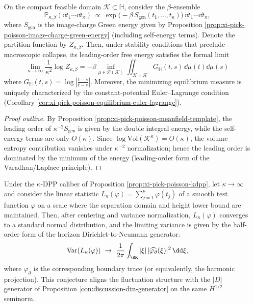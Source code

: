 \begin{proposition}\label{prop:xi-beta-ensemble-leading-free-energy}
On the compact feasible domain \(\mathcal K\subset\mathbb H\), consider the \(\beta\)-ensemble
\[
\mathbb P_{\kappa,\beta}(\dd t_1\cdots \dd t_\kappa)
\ \propto\
\exp\!\bigl(-\beta\,S_{\mathrm{gen}}(t_1,\dots,t_\kappa)\bigr)\,\dd t_1\cdots \dd t_\kappa,
\]
where \(S_{\mathrm{gen}}\) is the image-charge Green energy given by Proposition \ref{prop:xi-pick-poisson-image-charge-green-energy} (including self-energy terms).
Denote the partition function by \(Z_{\kappa,\beta}\).
Then, under stability conditions that preclude macroscopic collapse, its leading-order free energy satisfies the formal limit
\[
\boxed{\;
\lim_{\kappa\to\infty}\frac{1}{\kappa^2}\log Z_{\kappa,\beta}
=-\beta\inf_{\mu\in\mathcal P(\mathcal K)}
\iint_{\mathcal K\times\mathcal K}G_{\mathbb H}(t,s)\,\dd\mu(t)\dd\mu(s)\;}
\]
where \(G_{\mathbb H}(t,s)=\log\left|\frac{t-\overline s}{t-s}\right|\).
Moreover, the minimizing equilibrium measure is uniquely characterized by the constant-potential Euler--Lagrange condition (Corollary \ref{cor:xi-pick-poisson-equilibrium-euler-lagrange}).
\end{proposition}
\begin{proof}[Proof outline]
By Proposition \ref{prop:xi-pick-poisson-meanfield-template}, the leading order of \(\kappa^{-2}S_{\mathrm{gen}}\) is given by the double integral energy, while the self-energy terms are only \(O(\kappa)\).
Since \(\log\mathrm{Vol}(\mathcal K^\kappa)=O(\kappa)\), the volume entropy contribution vanishes under \(\kappa^{-2}\) normalization;
hence the leading order is dominated by the minimum of the energy (leading-order form of the Varadhan/Laplace principle). \qedhere
\end{proof}

\begin{conjecture}\label{conj:xi-kdpp-linear-statistics-clt}
Under the \(\kappa\)-DPP caliber of Proposition \ref{prop:xi-pick-poisson-kdpp}, let \(\kappa\to\infty\) and consider the linear statistic
\(
L_\kappa(\varphi)=\sum_{j=1}^{\kappa}\varphi(t_j)
\)
of a smooth test function \(\varphi\) on a scale where the separation domain and height lower bound are maintained.
Then, after centering and variance normalization, \(L_\kappa(\varphi)\) converges to a standard normal distribution, and the limiting variance is given by the half-order form of the horizon Dirichlet-to-Neumann generator:
\[
\mathrm{Var}(L_\kappa(\varphi))
\ \to\
\frac{1}{2\pi}\int_{\RR}|\xi|\,|\widehat{\varphi_{\partial}}(\xi)|^2\,\dd\xi,
\]
where \(\varphi_{\partial}\) is the corresponding boundary trace (or equivalently, the harmonic projection).
This conjecture aligns the fluctuation structure with the \(|D|\) generator of Proposition \ref{con:discussion-dtn-generator} on the same \(H^{1/2}\) seminorm.
\end{conjecture}

